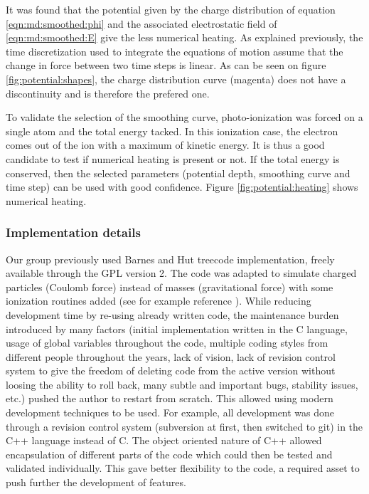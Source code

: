 It was found that the potential given by the charge distribution of equation
\eqref{eqn:md:smoothed:phi} and the associated electrostatic field of
\eqref{eqn:md:smoothed:E} give the less numerical heating. As explained
previously, the time discretization used to integrate the equations of motion
assume that the change in force between two time steps is linear. As can be
seen on figure \ref{fig:potential:shapes}, the charge distribution curve
(magenta) does not have a discontinuity and is therefore the prefered one.

To validate the selection of the smoothing curve, photo-ionization was forced
on a single atom and the total energy tacked. In this ionization case, the
electron comes out of the ion with a maximum of kinetic energy. It is thus a
good candidate to test if numerical heating is present or not. If the total
energy is conserved, then the selected parameters (potential depth, smoothing
curve and time step) can be used with good confidence. Figure
\ref{fig:potential:heating} shows numerical heating.



\subsubsection{Implementation details}

Our group previously used Barnes and Hut treecode implementation,
freely available\cite{treecode} through the GPL version 2. The code was adapted
to simulate charged particles (Coulomb force) instead of masses (gravitational
force) with some ionization routines added (see for example reference
\cite{Jungreuthmayer2005}). While reducing development time by re-using already
written code, the maintenance burden introduced by many factors (initial
implementation written in the C language, usage of global variables
throughout the code, multiple coding styles from different people throughout
the years, lack of vision, lack of revision control system to give the freedom
of deleting code from the active version without loosing the ability to roll
back, many subtle and important bugs, stability issues, etc.) pushed the author
to restart from scratch. This allowed using modern development techniques to be
used. For example, all development was done through a revision control system
(subversion\cite{svn} at first, then switched to git\cite{git}) in the C++
language instead of C. The object oriented nature of C++ allowed encapsulation
of different parts of the code which could then be tested and validated
individually. This gave better flexibility to the code, a required asset to
push further the development of features.

